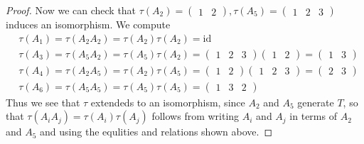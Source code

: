 \documentclass{article}
\begin{document}
\begin{proof}
Now we can check that $\tau\left(A_2\right)=\left(\begin{array}{ll}1 & 2\end{array}\right), \tau\left(A_5\right)=\left(\begin{array}{lll}1 & 2 & 3\end{array}\right)$ induces an isomorphism. We compute
$$
\begin{aligned}
& \tau\left(A_1\right)=\tau\left(A_2 A_2\right)=\tau\left(A_2\right) \tau\left(A_2\right)=\mathrm{id} \\
& \tau\left(A_3\right)=\tau\left(A_5 A_2\right)=\tau\left(A_5\right) \tau\left(A_2\right)=\left(\begin{array}{llll}
1 & 2 & 3
\end{array}\right)\left(\begin{array}{lll}
1 & 2
\end{array}\right)=\left(\begin{array}{ll}
1 & 3
\end{array}\right) \\
& \tau\left(A_4\right)=\tau\left(A_2 A_5\right)=\tau\left(A_2\right) \tau\left(A_5\right)=\left(\begin{array}{lll}
1 & 2
\end{array}\right)\left(\begin{array}{lll}
1 & 2 & 3
\end{array}\right)=\left(\begin{array}{ll}
2 & 3
\end{array}\right) \\
& \tau\left(A_6\right)=\tau\left(A_5 A_5\right)=\tau\left(A_5\right) \tau\left(A_5\right)=\left(\begin{array}{lll}
1 & 3 & 2
\end{array}\right)
\end{aligned}
$$
Thus we see that $\tau$ extendeds to an isomorphism, since $A_2$ and $A_5$ generate $T$, so that $\tau\left(A_i A_j\right)=\tau\left(A_i\right) \tau\left(A_j\right)$ follows from writing $A_i$ and $A_j$ in terms of $A_2$ and $A_5$ and using the equlities and relations shown above.
\end{proof}
\end{document}
